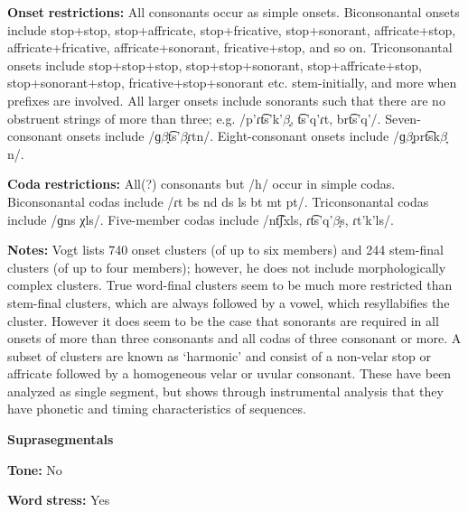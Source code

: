 \documentclass[output=paper]{langsci/langscibook}
\begin{document}
\begin{styleBody}
\textbf{Onset} \textbf{restrictions:} All consonants occur as simple onsets. Biconsonantal onsets include stop+stop, stop+affricate, stop+fricative, stop+sonorant, affricate+stop, affricate+fricative, affricate+sonorant, fricative+stop, and so on. Triconsonantal onsets include stop+stop+stop, stop+stop+sonorant, stop+affricate+stop, stop+sonorant+stop, fricative+stop+sonorant etc. stem-initially, and more when prefixes are involved. All larger onsets include sonorants such that there are no obstruent strings of more than three; e.g. /p’ɾt͡s’k'$\beta ̞$, t͡s’q’ɾt, brt͡s'q{}'/. Seven-consonant onsets include /ɡ$\beta ̞$t͡s’$\beta ̞ɾ$tn/. Eight-consonant onsets include /ɡ$\beta ̞$prt͡sk$\beta ̞$n/.
\end{styleBody}

\begin{styleBody}
\textbf{Coda} \textbf{restrictions:} All(?) consonants but /h/ occur in simple codas. Biconsonantal codas include /ɾt bs nd ds ls bt mt pt/. Triconsonantal codas include /ɡns χls/. Five-member codas include /nt͡ʃxls, ɾt͡s’q’$\beta ̞$s, ɾt'k'ls/.
\end{styleBody}

\begin{styleBody}
\textbf{Notes:} Vogt lists 740 onset clusters (of up to six members) and 244 stem-final clusters (of up to four members); however, he does not include morphologically complex clusters. True word-final clusters seem to be much more restricted than stem-final clusters, which are always followed by a vowel, which resyllabifies the cluster. However it does seem to be the case that sonorants are required in all onsets of more than three consonants and all codas of three consonant or more. A subset of clusters are known as ‘harmonic’ and consist of a non-velar stop or affricate followed by a homogeneous velar or uvular consonant. These have been analyzed as single segment, but \citet{Chitoran1998} shows through instrumental analysis that they have phonetic and timing characteristics of sequences.
\end{styleBody}

\begin{styleBody}
\textbf{Suprasegmentals}
\end{styleBody}

\begin{styleBody}
\textbf{Tone:} No
\end{styleBody}

\begin{styleBody}
\textbf{Word} \textbf{stress:} Yes
\end{styleBody}
\end{document}
